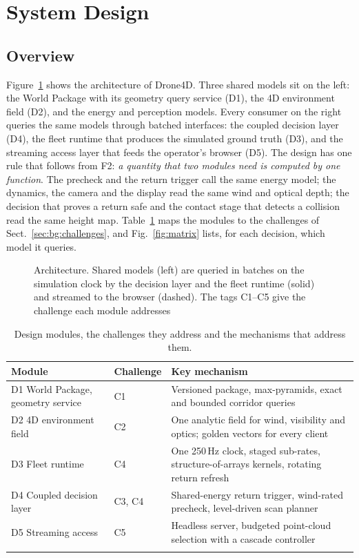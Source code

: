 \section{System Design}\label{sec:design}

\subsection{Overview}\label{sec:design:overview}

Figure~\ref{fig:arch} shows the architecture of Drone4D. Three shared models sit on the left: the World Package with its geometry
query service (D1), the 4D environment field (D2), and the energy and perception models. Every consumer on the right
queries the same models through batched interfaces: the coupled decision layer (D4), the fleet runtime that produces
the simulated ground truth (D3), and the streaming access layer that feeds the operator's browser (D5). The design has
one rule that follows from F2: \emph{a quantity that two modules need is computed by one function}. The precheck and
the return trigger call the same energy model; the dynamics, the camera and the display read the same wind and optical
depth; the decision that proves a return safe and the contact stage that detects a collision read the same height map.
Table~\ref{tab:map} maps the modules to the challenges of Sect.~\ref{sec:bg:challenges}, and
Fig.~\ref{fig:matrix} lists, for each decision, which model it queries.

\begin{figure}[t]
\centering
\resizebox{\textwidth}{!}{}
\caption{Architecture. Shared models (left) are queried in batches on the simulation clock by the decision layer and
the fleet runtime (solid) and streamed to the browser (dashed). The tags C1--C5 give the challenge each module addresses}
\label{fig:arch}
\end{figure}

\begin{table}[t]
\caption{Design modules, the challenges they address and the mechanisms that address them.}
\label{tab:map}
\footnotesize
\begin{tabular*}{\textwidth}{@{\extracolsep\fill}llp{6.3cm}@{}}
\toprule
Module & Challenge & Key mechanism \\
\midrule
D1 World Package, geometry service & C1 & Versioned package, max-pyramids, exact and bounded corridor queries \\
D2 4D environment field & C2 & One analytic field for wind, visibility and optics; golden vectors for every client \\
D3 Fleet runtime & C4 & One 250\,Hz clock, staged sub-rates, structure-of-arrays kernels, rotating return refresh \\
D4 Coupled decision layer & C3, C4 & Shared-energy return trigger, wind-rated precheck, level-driven scan planner \\
D5 Streaming access & C5 & Headless server, budgeted point-cloud selection with a cascade controller \\
\botrule
\end{tabular*}
\end{table}

